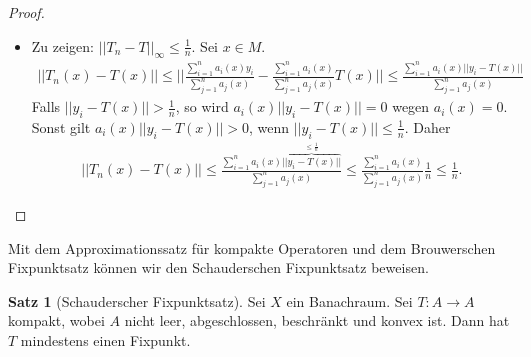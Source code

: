 \documentclass[a4paper]{article}
\theoremstyle{definition}
\newtheorem*{theorem*}{Satz}
\begin{document}
\begin{proof}
\begin{itemize}
        \item Zu zeigen: $||T_n - T||_\infty \leq \frac{1}{n}$. Sei $x \in M$.
        \begin{align*}
            ||T_n(x) - T(x)|| %
            \leq ||\frac{\sum^n_{i=1}a_i(x)y_i}{\sum^n_{j=1} a_j(x)} - \frac{\sum^n_{i=1} a_i(x)}{\sum^n_{j=1} a_j(x)} T(x)|| %
            \leq \frac{\sum^n_{i=1}a_i(x)||y_i - T(x)||}{\sum^n_{j=1} a_j(x)}
        \end{align*}
        Falls $||y_i - T(x)||>\frac{1}{n}$, so wird $a_i(x)||y_i - T(x)|| = 0$ wegen $a_i(x) = 0$. Sonst gilt $a_i(x)||y_i - T(x)|| > 0$, wenn $||y_i - T(x)||\leq \frac{1}{n}$. 
        Daher 
        \begin{align*}
            ||T_n(x) - T(x)|| %
            \leq \frac{\sum^n_{i=1}a_i(x)\overbrace{||y_i - T(x)||}^{\leq\frac{1}{n}}}{\sum^n_{j=1} a_j(x)} \leq \frac{\sum^n_{i=1}a_i(x)}{\sum^n_{j=1} a_j(x)} \frac{1}{n}  \leq \frac{1}{n}.
        \end{align*}
    \end{itemize}
\end{proof}

Mit dem Approximationssatz für kompakte Operatoren und dem Brouwerschen Fixpunktsatz können wir den Schauderschen Fixpunktsatz beweisen.

\begin{theorem*}[Schauderscher Fixpunktsatz]
    Sei $X$ ein Banachraum. Sei $T: A \to A$ kompakt, wobei $A$ nicht leer, abgeschlossen, beschränkt und konvex ist. Dann hat $T$ mindestens einen Fixpunkt.
\end{theorem*}
\end{document}
